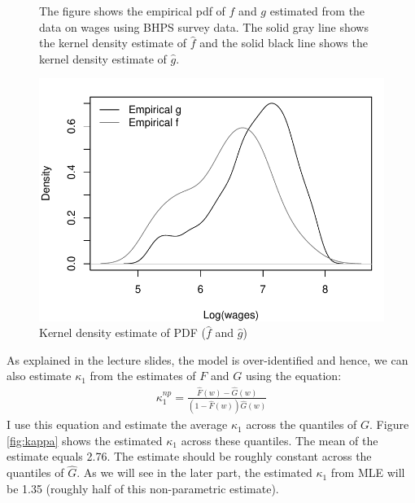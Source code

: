 \documentclass[11pt,letterpaper]{article}
\newcommand{\floatintro}[1]{
  
  \vspace*{0.1in}
  
  {\footnotesize

    #1
    
  }
  
  \vspace*{0.1in} }
\begin{document}
\begin{enumerate}
  \begin{figure}[htbp!]
    \floatintro{The figure shows the empirical pdf of $f$ and $g$
      estimated from the data on wages using BHPS survey data. The
      solid gray line shows the kernel density estimate of $\hat f$
      and the solid black line shows the kernel density estimate of
      $\hat g$.}  \centering
    \includegraphics[scale=.6]{./pics/FG_density.pdf}
    \caption{Kernel density estimate of PDF ($\hat f$ and $\hat g$)}
    \label{fig:Gdens}
  \end{figure}
  As explained in the lecture slides, the model is over-identified and
  hence, we can also estimate $\kappa_1$ from the estimates of $F$ and
  $G$ using the equation:
  \begin{align*}
    \kappa_1^{np} = \frac{\hat F(w) - \hat G(w)}{(1-\hat F(w)) \hat G(w)}
  \end{align*}
  I use this equation and estimate the average $\kappa_1$ across the
  quantiles of $G$. Figure \ref{fig:kappa} shows the estimated
  $\kappa_1$ across these quantiles. The mean of the estimate equals
  2.76. The estimate should be roughly constant across the quantiles
  of $\hat G$. As we will see in the later part, the estimated
  $\kappa_1$ from MLE will be 1.35 (roughly half of this
  non-parametric estimate).


\end{enumerate}
\end{document}
